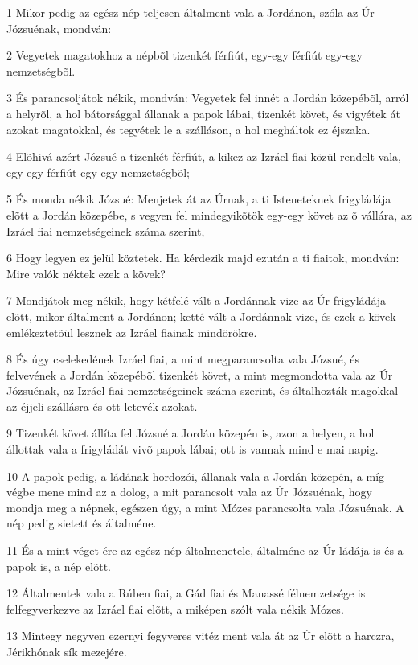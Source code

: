 \par 1 Mikor pedig az egész nép teljesen általment vala a Jordánon, szóla az Úr Józsuénak, mondván:
\par 2 Vegyetek magatokhoz a népbõl tizenkét férfiút, egy-egy férfiút egy-egy nemzetségbõl.
\par 3 És parancsoljátok nékik, mondván: Vegyetek fel innét a Jordán közepébõl, arról a helyrõl, a hol bátorsággal állanak a papok lábai, tizenkét követ, és vigyétek át azokat magatokkal, és tegyétek le a szálláson, a hol megháltok ez éjszaka.
\par 4 Elõhivá azért Józsué a tizenkét férfiút, a kikez az Izráel fiai közül rendelt vala, egy-egy férfiút egy-egy nemzetségbõl;
\par 5 És monda nékik Józsué: Menjetek át az Úrnak, a ti Isteneteknek frigyládája elõtt a Jordán közepébe, s vegyen fel mindegyikõtök egy-egy követ az õ vállára, az Izráel fiai nemzetségeinek száma szerint,
\par 6 Hogy legyen ez jelül köztetek. Ha kérdezik majd ezután a ti fiaitok, mondván: Mire valók néktek ezek a kövek?
\par 7 Mondjátok meg nékik, hogy kétfelé vált a Jordánnak vize az Úr frigyládája elõtt, mikor általment a Jordánon; ketté vált a Jordánnak vize, és ezek a kövek emlékeztetõül lesznek az Izráel fiainak mindörökre.
\par 8 És úgy cselekedének Izráel fiai, a mint megparancsolta vala Józsué, és felvevének a Jordán közepébõl tizenkét követ, a mint megmondotta vala az Úr Józsuénak, az Izráel fiai nemzetségeinek száma szerint, és általhozták magokkal az éjjeli szállásra és ott letevék azokat.
\par 9 Tizenkét követ állíta fel Józsué a Jordán közepén is, azon a helyen, a hol állottak vala a frigyládát vivõ papok lábai; ott is vannak mind e mai napig.
\par 10 A papok pedig, a ládának hordozói, állanak vala a Jordán közepén, a míg végbe mene mind az a dolog, a mit parancsolt vala az Úr Józsuénak, hogy mondja meg a népnek, egészen úgy, a mint Mózes parancsolta vala Józsuénak. A nép pedig sietett és általméne.
\par 11 És a mint véget ére az egész nép általmenetele, általméne az Úr ládája is és a papok is, a nép elõtt.
\par 12 Általmentek vala a Rúben fiai, a Gád fiai és Manassé félnemzetsége is felfegyverkezve az Izráel fiai elõtt, a miképen szólt vala  nékik Mózes.
\par 13 Mintegy negyven ezernyi fegyveres vitéz ment vala át az Úr elõtt a harczra, Jérikhónak sík mezejére.
